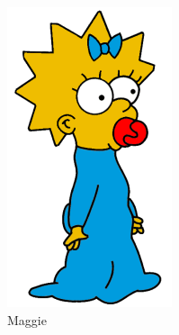 \documentclass[paper=a4, fontsize=11pt]{scrartcl} %
\numberwithin{equation}{section} %
\numberwithin{figure}{section} %
\numberwithin{table}{section} %
\begin{document}
\begin{figure}
\begin{subfigure}[b]{0.15\textwidth}
        \includegraphics[width=\textwidth]{maggie001}
        \caption{Maggie}
        \label{fig:maggie}
    \end{subfigure}
    ~ %
    \begin{subfigure}[b]{0.15\textwidth}

\end{subfigure}
\end{figure}
\end{document}
